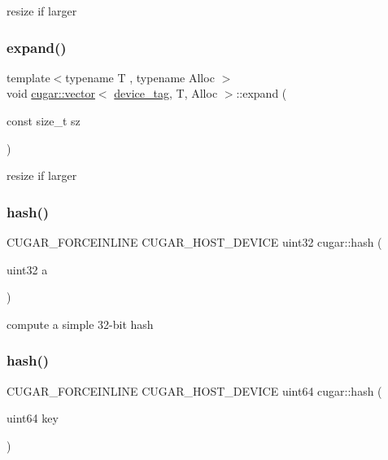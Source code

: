 resize if larger \mbox{\label{group___basic_ga872aa5811aafdfdae83d56c76378bf53}} 
\subsubsection{\texorpdfstring{expand()}{expand()}\hspace{0.1cm}{\footnotesize\ttfamily [2/2]}}
{\footnotesize\ttfamily template$<$typename T , typename Alloc $>$ \\
void \hyperlink{structcugar_1_1vector}{cugar\+::vector}$<$ \hyperlink{structcugar_1_1device__tag}{device\+\_\+tag}, T, Alloc $>$\+::expand (\begin{DoxyParamCaption}\item[{const size\+\_\+t}]{sz }\end{DoxyParamCaption})\hspace{0.3cm}{\ttfamily [inline]}}

resize if larger \mbox{\label{group___basic_ga4c88b92d7c3a2616868a11282da2be2f}} 
\subsubsection{\texorpdfstring{hash()}{hash()}\hspace{0.1cm}{\footnotesize\ttfamily [1/2]}}
{\footnotesize\ttfamily C\+U\+G\+A\+R\+\_\+\+F\+O\+R\+C\+E\+I\+N\+L\+I\+NE C\+U\+G\+A\+R\+\_\+\+H\+O\+S\+T\+\_\+\+D\+E\+V\+I\+CE uint32 cugar\+::hash (\begin{DoxyParamCaption}\item[{uint32}]{a }\end{DoxyParamCaption})}

compute a simple 32-\/bit hash \mbox{\label{group___basic_ga0dc531cb9c8f578fc90e08cbd390e4c2}} 
\subsubsection{\texorpdfstring{hash()}{hash()}\hspace{0.1cm}{\footnotesize\ttfamily [2/2]}}
{\footnotesize\ttfamily C\+U\+G\+A\+R\+\_\+\+F\+O\+R\+C\+E\+I\+N\+L\+I\+NE C\+U\+G\+A\+R\+\_\+\+H\+O\+S\+T\+\_\+\+D\+E\+V\+I\+CE uint64 cugar\+::hash (\begin{DoxyParamCaption}\item[{uint64}]{key }\end{DoxyParamCaption})}

